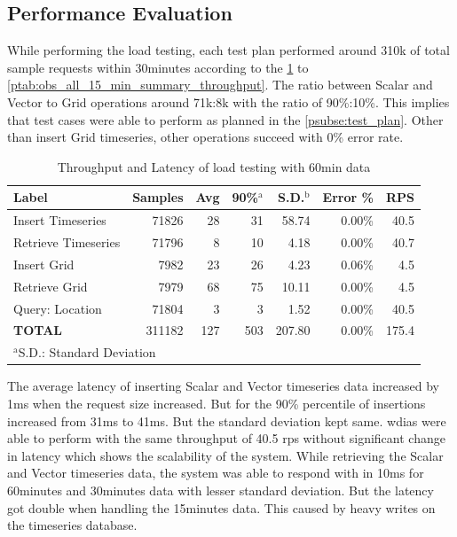 \documentclass[conference]{IEEEtran}
\begin{document}
\subsection{Performance Evaluation}
\label{psubse:performance_evaluation}

While performing the load testing, each test plan performed around 310k of total sample requests within 30minutes according to the \cref{ptab:obs_all_60_min_summary_throughput} to \cref{ptab:obs_all_15_min_summary_throughput}. The ratio between Scalar and Vector to Grid operations around 71k:8k with the ratio of 90\%:10\%. This implies that test cases were able to perform as planned in the \cref{psubse:test_plan}.
Other than insert Grid timeseries, other operations succeed with 0\% error rate.

\begin{table}[htbp]
\centering
\caption{Throughput and Latency of load testing with 60min data}
\begin{adjustbox}{width=0.45\textwidth}
\begin{tabular}{|l|r|r|r|r|r|r|}
\hline
\textbf{Label} & \textbf{Samples} & \textbf{Avg} & \textbf{90\%$^{\mathrm{a}}$} & \textbf{S.D.$^{\mathrm{b}}$} & \textbf{Error \%} & \textbf{RPS} \\ \hline
Insert Timeseries & 71826 & 28 & 31 & 58.74 & 0.00\% & 40.5 \\ \hline
Retrieve Timeseries & 71796 & 8 & 10 & 4.18 & 0.00\% & 40.7 \\ \hline
Insert Grid & 7982 & 23 & 26 & 4.23 & 0.06\% & 4.5 \\ \hline
Retrieve Grid & 7979 & 68 & 75 & 10.11 & 0.00\% & 4.5 \\ \hline
Query: Location & 71804 & 3 & 3 & 1.52 & 0.00\% & 40.5 \\ \hline
\textbf{TOTAL} & 311182 & 127 & 503 & 207.80 & 0.00\% & 175.4 \\ \hline
\multicolumn{4}{l}{$^{\mathrm{a}}$S.D.: Standard Deviation}{$^{\mathrm{b}}$90\%: 90\% percentile}
\end{tabular}
\end{adjustbox}
\label{ptab:obs_all_60_min_summary_throughput}
\end{table}

The average latency of inserting Scalar and Vector timeseries data increased by 1ms when the request size increased. But for the 90\% percentile of insertions increased from 31ms to 41ms. But the standard deviation kept same. \acrshort{wdias} were able to perform with the same throughput of 40.5 \acrshort{rps} without significant change in latency which shows the scalability of the system.
While retrieving the Scalar and Vector timeseries data, the system was able to respond with in 10ms for 60minutes and 30minutes data with lesser standard deviation. But the latency got double when handling the 15minutes data. This caused by heavy writes on the timeseries database.
\end{document}
